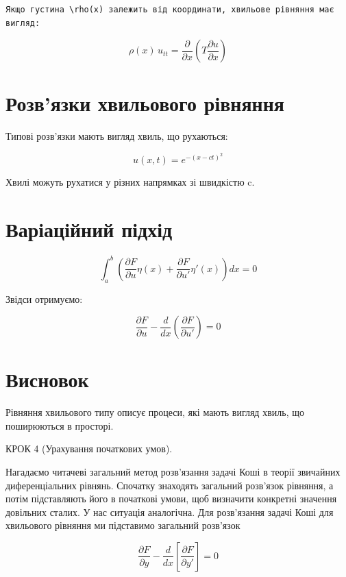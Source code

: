 \documentclass[
  ukrainian,
]{article}
\begin{document}
\begin{verbatim}
Якщо густина \rho(x) залежить від координати, хвильове рівняння має вигляд:
\end{verbatim}

\[
\rho(x)\,u_{tt} = \frac{\partial}{\partial x}\left( T \frac{\partial u}{\partial x} \right)
\]

\section{Розв'язки хвильового
рівняння}\label{ux440ux43eux437ux432ux44fux437ux43aux438-ux445ux432ux438ux43bux44cux43eux432ux43eux433ux43e-ux440ux456ux432ux43dux44fux43dux43dux44f}

Типові розв'язки мають вигляд хвиль, що рухаються:

\[
u(x,t) = e^{-(x - ct)^2}
\]

Хвилі можуть рухатися у різних напрямках зі швидкістю c.

\section{Варіаційний
підхід}\label{ux432ux430ux440ux456ux430ux446ux456ux439ux43dux438ux439-ux43fux456ux434ux445ux456ux434}

\[
\int_a^b \left( \frac{\partial F}{\partial u} \eta(x) + \frac{\partial F}{\partial u'} \eta'(x) \right) dx = 0
\]

Звідси отримуємо:

\[
\frac{\partial F}{\partial u} - \frac{d}{dx}\left( \frac{\partial F}{\partial u'} \right) = 0
\]

\section{Висновок}\label{ux432ux438ux441ux43dux43eux432ux43eux43a-1}

Рівняння хвильового типу описує процеси, які мають вигляд хвиль, що
поширюються в просторі.

КРОК 4 (Урахування початкових умов).

Нагадаємо читачеві загальний метод розв'язання задачі Коші в теорії
звичайних диференціальних рівнянь. Спочатку знаходять загальний
розв'язок рівняння, а потім підставляють його в початкові умови, щоб
визначити конкретні значення довільних сталих. У нас ситуація
аналогічна. Для розв'язання задачі Коші для хвильового рівняння ми
підставимо загальний розв'язок

\[
\frac{\partial F}{\partial y} - \frac{d}{dx} \left[ \frac{\partial F}{\partial y'} \right] = 0
\]
\end{document}
